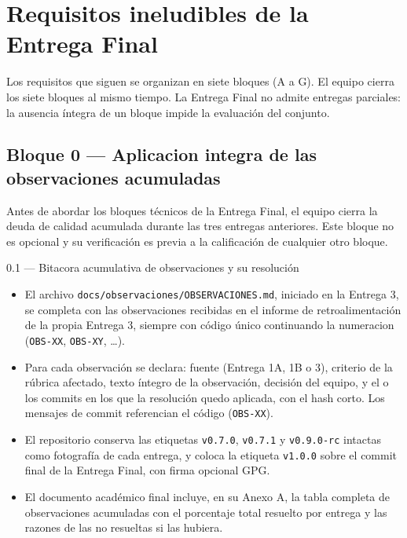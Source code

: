 \documentclass[11pt,a4paper]{article}
\begin{document}
\section{Requisitos ineludibles de la Entrega Final}

Los requisitos que siguen se organizan en siete bloques (A a G). El equipo cierra los siete bloques al mismo tiempo. La Entrega Final no admite entregas parciales: la ausencia \'{i}ntegra de un bloque impide la evaluaci\'{o}n del conjunto.

\subsection{Bloque 0 --- Aplicacion integra de las observaciones acumuladas}

Antes de abordar los bloques t\'{e}cnicos de la Entrega Final, el equipo cierra la deuda de calidad acumulada durante las tres entregas anteriores. Este bloque no es opcional y su verificaci\'{o}n es previa a la calificaci\'{o}n de cualquier otro bloque.

\begin{cajaentregable}{0.1 --- Bitacora acumulativa de observaciones y su resoluci\'{o}n}
    \begin{itemize}
        \item El archivo \texttt{docs/observaciones/OBSERVACIONES.md}, iniciado en la Entrega 3, se completa con las observaciones recibidas en el informe de retroalimentaci\'{o}n de la propia Entrega 3, siempre con c\'{o}digo \'{u}nico continuando la numeracion (\texttt{OBS-XX}, \texttt{OBS-XY}, \ldots).
        \item Para cada observaci\'{o}n se declara: fuente (Entrega 1A, 1B o 3), criterio de la r\'{u}brica afectado, texto \'{i}ntegro de la observaci\'{o}n, decisi\'{o}n del equipo, y el o los commits en los que la resoluci\'{o}n quedo aplicada, con el hash corto. Los mensajes de commit referencian el c\'{o}digo (\texttt{OBS-XX}).
        \item El repositorio conserva las etiquetas \texttt{v0.7.0}, \texttt{v0.7.1} y \texttt{v0.9.0-rc} intactas como fotograf\'{i}a de cada entrega, y coloca la etiqueta \texttt{v1.0.0} sobre el commit final de la Entrega Final, con firma opcional GPG.
        \item El documento acad\'{e}mico final incluye, en su Anexo A, la tabla completa de observaciones acumuladas con el porcentaje total resuelto por entrega y las razones de las no resueltas si las hubiera.
    \end{itemize}
\end{cajaentregable}
\end{document}
